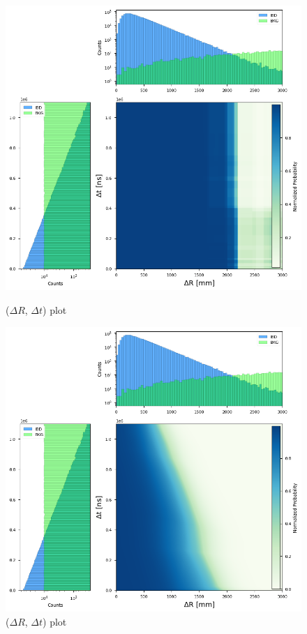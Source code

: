 \begin{figure}[h!]
	\centering
	\begin{minipage}{0.5\textwidth}
		\centering
		\includegraphics[width=0.9\linewidth]{Images/dr_dt_xgboost}
		\caption{($\Delta R$, $\Delta t$) plot}
		\label{fig:dr_dt_xgboost}
	\end{minipage}%
	\begin{minipage}{0.5\textwidth}
		\centering
		\includegraphics[width=0.9\linewidth]{Images/dr_dt_pytorch}
		\caption{($\Delta R$, $\Delta t$) plot}
		\label{fig:dr_dt_pytorch}
	\end{minipage}
\end{figure}


